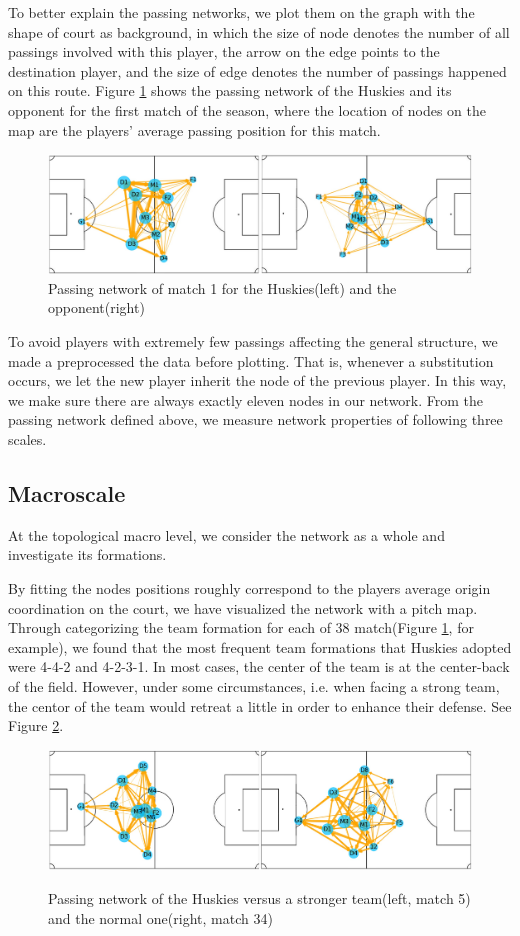 \documentclass{mcmthesis}
\begin{document}
To better explain the passing networks, we plot them on the graph with the shape of court as background, in which the size of node denotes the number of all passings involved with this player, the arrow on the edge points to the destination player, and the size of edge denotes the number of passings happened on this route. Figure \ref{f1} shows the passing network of the Huskies and its opponent for the first match of the season, where the location of nodes on the map are the players' average passing position for this match.
\begin{figure}[htbp]
  \label{f1}
  \centering
  \caption{Passing network of match 1 for the Huskies(left) and the opponent(right)}
  \includegraphics[width=14cm]{match1.png}
\end{figure}
To avoid players with extremely few passings affecting the general structure, we made a preprocessed the data before plotting. That is, whenever a substitution occurs, we let the new player inherit the node of the previous player. In this way, we make sure there are always exactly eleven nodes in our network.
From the passing network defined above, we measure network properties of following three scales.
\subsection{Macroscale}
At the topological macro level, we consider the network as a whole and investigate its formations. 

By fitting the nodes positions roughly correspond to the players average origin coordination on the court, we have visualized the network with a pitch map. Through categorizing the team formation for each of 38 match(Figure \ref{f1}, for example), we found that the most frequent team formations that Huskies adopted were 4-4-2 and 4-2-3-1. In most cases, the center of the team is at the center-back of the field. However, under some circumstances, i.e. when facing a strong team, the centor of the team would retreat a little in order to enhance their defense. See Figure \ref{f2}.
\begin{figure}[htbp]
  \centering
  \caption{Passing network of the Huskies versus a stronger team(left, match 5) and the normal one(right, match 34)}
  \includegraphics[width=14cm]{match2.png}
  \label{f2}
\end{figure}
\end{document}

